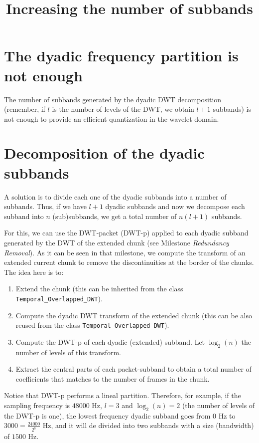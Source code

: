 
\title{Increasing the number of subbands}

\maketitle
\tableofcontents

\section{The dyadic frequency partition is not enough}

The number of subbands generated by the dyadic DWT decomposition
(remember, if $l$ is the number of levels of the DWT, we obtain $l+1$
subbands) is not enough to provide an efficient quantization in the
wavelet domain.

\section{Decomposition of the dyadic subbands}

A solution is to divide each one of the dyadic subbands into a number
of subbands. Thus, if we have $l+1$ dyadic subbands and now we
decompose each subband into $n$ (sub)subbands, we get a total number
of $n(l+1)$ subbands.

For this, we can use the DWT-packet (DWT-p) applied to each dyadic
subband generated by the DWT of the extended chunk (see Milestone
\emph{Redundancy Removal}). As it can be seen in that milestone, we
compute the transform of an extended current chunk to remove the
discontinuities at the border of the chunks. The idea here is to:
\begin{enumerate}
\item Extend the chunk (this can be inherited from the class
  \verb|Temporal_Overlapped_DWT|).
\item Compute the dyadic DWT transform of the extended chunk (this can
  be also reused from the class \verb|Temporal_Overlapped_DWT|).
\item Compute the DWT-p of each dyadic (extended) subband. Let
  $\log_2(n)$ the number of levels of this transform.
\item Extract the central parts of each packet-subband to obtain a
  total number of coefficients that matches to the number of frames in
  the chunk.
\end{enumerate}
  
Notice that DWT-p performs a lineal partition. Therefore, for example,
if the sampling frequency is $48000$ Hz, $l=3$ and $\log_2(n)=2$ (the
number of levels of the DWT-p is one), the lowest frequency dyadic
subband goes from $0$ Hz to $3000=\frac{24000}{2^8}$ Hz, and it will de
divided into two subbands with a size (bandwidth) of $1500$ Hz.

